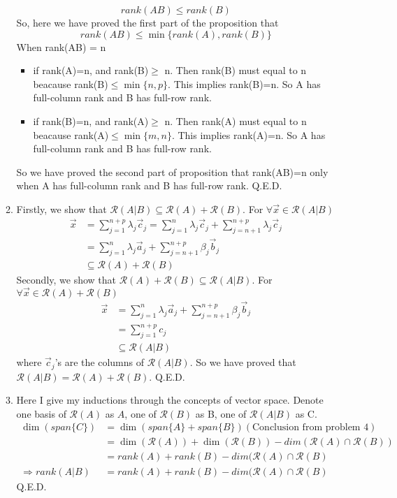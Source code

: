 \begin{enumerate}
\begin{enumerate}
		$$rank(AB)\le rank(B)$$
		So, here we have proved the first part of the proposition that
		$$rank(AB)\le \min\{rank(A),rank(B)\}$$
		When rank(AB) = n
		\begin{itemize}
			\item if rank(A)=n, and rank(B)$\ge$ n. Then rank(B) must equal to n beacause rank(B)$\le\min\{n,p\}$. This implies rank(B)=n. So A has full-column rank and B has full-row rank.
			\item if rank(B)=n, and rank(A)$\ge$ n. Then rank(A) must equal to n beacause rank(A)$\le\min\{m,n\}$. This implies rank(A)=n. So A has full-column rank and B has full-row rank.
		\end{itemize}
		So we have proved the second part of proposition that rank(AB)=n only when A has full-column rank and B has full-row rank. Q.E.D.
		
		\item Firstly, we show that $\mathcal{R}(A|B)\subseteq \mathcal{R}(A)+\mathcal{R}(B)$. For $\forall \vec{x} \in \mathcal{R}(A|B)$
		\begin{align*}
		\vec{x} &= \sum_{j=1}^{n+p}\lambda_j\vec{c}_j=\sum_{j=1}^{n}\lambda_j\vec{c}_j+\sum_{j=n+1}^{n+p}\lambda_j\vec{c}_j\\&=\sum_{j=1}^{n}\lambda_j\vec{a}_j+\sum_{j=n+1}^{n+p}\beta_j\vec{b}_j\\&\subseteq \mathcal{R}(A)+\mathcal{R}(B)
		\end{align*}
		Secondly, we show that $ \mathcal{R}(A)+\mathcal{R}(B) \subseteq \mathcal{R}(A|B)$. For $\forall \vec{x} \in\mathcal{R}(A)+\mathcal{R}(B)$
		\begin{align*}
		\vec{x} &= \sum_{j=1}^{n}\lambda_j\vec{a}_j+\sum_{j=n+1}^{n+p}\beta_j\vec{b}_j\\
		&=\sum_{j=1}^{n+p}c_j\\
		&\subseteq \mathcal{R}(A|B)
		\end{align*}
		where $\vec{c}_j$'s are the columns of $\mathcal{R}(A|B)$. So we have proved that $\mathcal{R}(A|B)= \mathcal{R}(A)+\mathcal{R}(B)$. Q.E.D.
		
		\item Here I give my inductions through the concepts of vector space. Denote one basis of $\mathcal{R}(A)$ as $A$, one of $\mathcal{R}(B)$ as B, one of $\mathcal{R}(A|B)$ as C.
		\begin{align*}
		\dim(span\{C\}) &= \dim(span\{A\}+span\{B\}) (\text{Conclusion from problem 4})\\
		&=\dim(\mathcal{R}(A)) + \dim(\mathcal{R}(B)) - dim(\mathcal{R}(A)\cap\mathcal{R}(B))\\
		&=rank(A)+rank(B)-dim(\mathcal{R}(A)\cap\mathcal{R}(B)\\
		\Rightarrow rank(A|B) &=rank(A)+rank(B)-dim(\mathcal{R}(A)\cap\mathcal{R}(B)
		\end{align*}
		Q.E.D.
	\end{enumerate}
\end{enumerate}